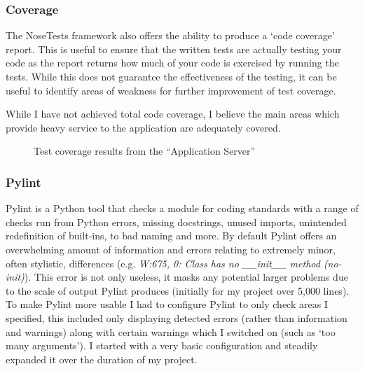 \documentclass{article}
\begin{document}
\subsubsection{Coverage}
The NoseTests framework also offers the ability to produce a `code coverage' report. This is useful to ensure that the written tests are actually testing your code as the report returns how much of your code is exercised by running the tests. While this does not guarantee the effectiveness of the testing, it can be useful to identify areas of weakness for further improvement of test coverage.

While I have not achieved total code coverage, I believe the main areas which provide heavy service to the application are adequately covered.

\clearpage
\begin{figure}[h]
	\noindent
	\caption{Test coverage results from the ``Application Server''}
\end{figure}

\subsubsection{Pylint}
Pylint is a Python tool that checks a module for coding standards with a range of checks run from Python errors, missing docstrings, unused imports, unintended redefinition of built-ins, to bad naming and more. By default Pylint offers an overwhelming amount of information and errors relating to extremely minor, often stylistic, differences (e.g. \textit{W:675, 0: Class has no \_\_init\_\_ method (no-init)}). This error is not only useless, it masks any potential larger problems due to the scale of output Pylint produces (initially for my project over 5,000 lines). To make Pylint more usable I had to configure Pylint to only check areas I specified, this included only displaying detected errors (rather than information and warnings) along with certain warnings which I switched on (such as `too many arguments'). I started with a very basic configuration and steadily expanded it over the duration of my project. 
\end{document}
